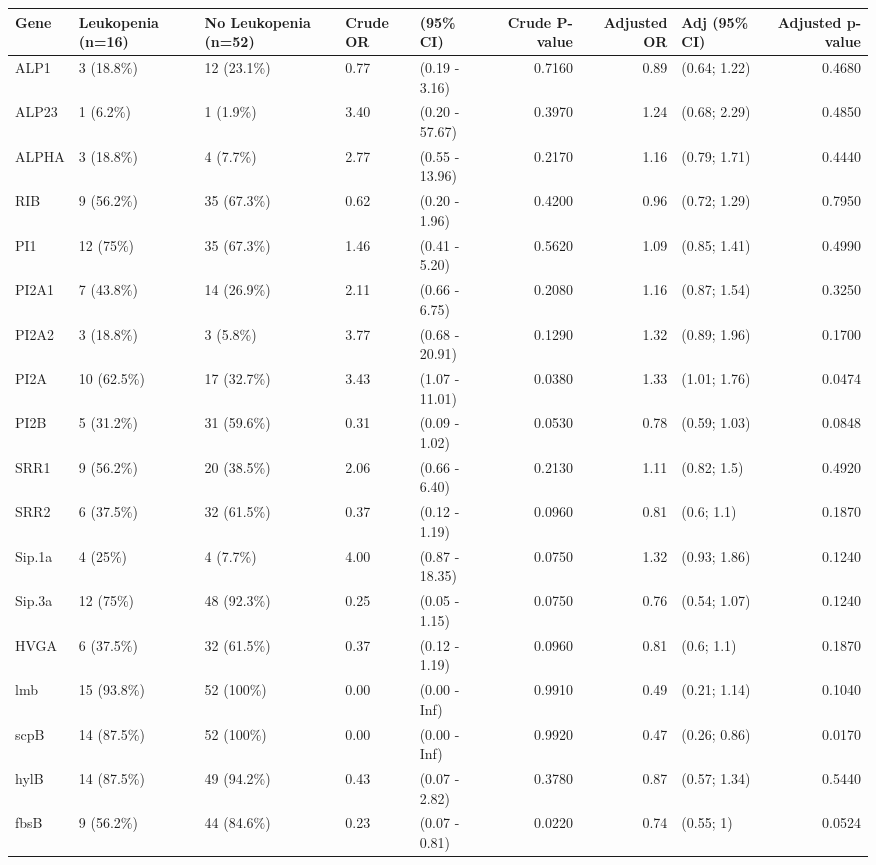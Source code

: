 \begin{table}[ht]
\centering
\begin{tabular}{lllllrrlr}
  \hline
Gene & Leukopenia (n=16) & No Leukopenia (n=52) & Crude OR & (95\% CI) & Crude P-value & Adjusted OR & Adj (95\% CI) & Adjusted p-value \\ 
  \hline
ALP1 & 3 (18.8\%) & 12 (23.1\%) & 0.77 & (0.19 - 3.16) & 0.7160 & 0.89 & (0.64; 1.22) & 0.4680 \\ 
  ALP23 & 1 (6.2\%) & 1 (1.9\%) & 3.40 & (0.20 - 57.67) & 0.3970 & 1.24 & (0.68; 2.29) & 0.4850 \\ 
  ALPHA & 3 (18.8\%) & 4 (7.7\%) & 2.77 & (0.55 - 13.96) & 0.2170 & 1.16 & (0.79; 1.71) & 0.4440 \\ 
  RIB & 9 (56.2\%) & 35 (67.3\%) & 0.62 & (0.20 - 1.96) & 0.4200 & 0.96 & (0.72; 1.29) & 0.7950 \\ 
  PI1 & 12 (75\%) & 35 (67.3\%) & 1.46 & (0.41 - 5.20) & 0.5620 & 1.09 & (0.85; 1.41) & 0.4990 \\ 
  PI2A1 & 7 (43.8\%) & 14 (26.9\%) & 2.11 & (0.66 - 6.75) & 0.2080 & 1.16 & (0.87; 1.54) & 0.3250 \\ 
  PI2A2 & 3 (18.8\%) & 3 (5.8\%) & 3.77 & (0.68 - 20.91) & 0.1290 & 1.32 & (0.89; 1.96) & 0.1700 \\ 
  PI2A & 10 (62.5\%) & 17 (32.7\%) & 3.43 & (1.07 - 11.01) & 0.0380 & 1.33 & (1.01; 1.76) & 0.0474 \\ 
  PI2B & 5 (31.2\%) & 31 (59.6\%) & 0.31 & (0.09 - 1.02) & 0.0530 & 0.78 & (0.59; 1.03) & 0.0848 \\ 
  SRR1 & 9 (56.2\%) & 20 (38.5\%) & 2.06 & (0.66 - 6.40) & 0.2130 & 1.11 & (0.82; 1.5) & 0.4920 \\ 
  SRR2 & 6 (37.5\%) & 32 (61.5\%) & 0.37 & (0.12 - 1.19) & 0.0960 & 0.81 & (0.6; 1.1) & 0.1870 \\ 
  Sip.1a & 4 (25\%) & 4 (7.7\%) & 4.00 & (0.87 - 18.35) & 0.0750 & 1.32 & (0.93; 1.86) & 0.1240 \\ 
  Sip.3a & 12 (75\%) & 48 (92.3\%) & 0.25 & (0.05 - 1.15) & 0.0750 & 0.76 & (0.54; 1.07) & 0.1240 \\ 
  HVGA & 6 (37.5\%) & 32 (61.5\%) & 0.37 & (0.12 - 1.19) & 0.0960 & 0.81 & (0.6; 1.1) & 0.1870 \\ 
  lmb & 15 (93.8\%) & 52 (100\%) & 0.00 & (0.00 - Inf) & 0.9910 & 0.49 & (0.21; 1.14) & 0.1040 \\ 
  scpB & 14 (87.5\%) & 52 (100\%) & 0.00 & (0.00 - Inf) & 0.9920 & 0.47 & (0.26; 0.86) & 0.0170 \\ 
  hylB & 14 (87.5\%) & 49 (94.2\%) & 0.43 & (0.07 - 2.82) & 0.3780 & 0.87 & (0.57; 1.34) & 0.5440 \\ 
  fbsB & 9 (56.2\%) & 44 (84.6\%) & 0.23 & (0.07 - 0.81) & 0.0220 & 0.74 & (0.55; 1) & 0.0524 \\ 
   \hline
\end{tabular}
\end{table}
